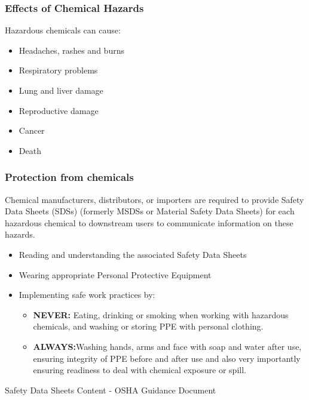 \subsubsection{Effects of Chemical Hazards}

Hazardous chemicals can cause:
\begin{itemize}
\item Headaches, rashes and burns
\item Respiratory problems
\item Lung and liver damage
\item Reproductive damage
\item Cancer
\item Death
\end{itemize} 


\subsubsection{Protection from chemicals}
Chemical manufacturers, distributors, or importers are required to provide Safety Data Sheets (SDSs) (formerly MSDSs or Material Safety Data Sheets) for each hazardous chemical to downstream users to communicate information on these hazards.
\begin{itemize}
\item Reading and understanding the associated Safety Data Sheets
\item Wearing appropriate Personal Protective Equipment
\item Implementing safe work practices by:
\begin{itemize}
\item \textbf{NEVER:} Eating, drinking or smoking when working with hazardous chemicals, and washing or storing PPE with personal clothing.
\item \textbf{ALWAYS:}Washing hands, arms and face with soap and water after use, ensuring integrity of PPE before and after use and also very importantly ensuring  readiness to deal with chemical exposure or spill.
\end{itemize}
\end{itemize}
\newpage
\hspace{0pt}
\vfill
\begin{center}
Safety Data Sheets Content - OSHA Guidance Document
\end{center}
\vfill
\hspace{0pt}
\pagebreak
\hspace{0pt}
\vfill
\begin{center}
\end{center}
\vfill
\hspace{0pt}
\pagebreak



